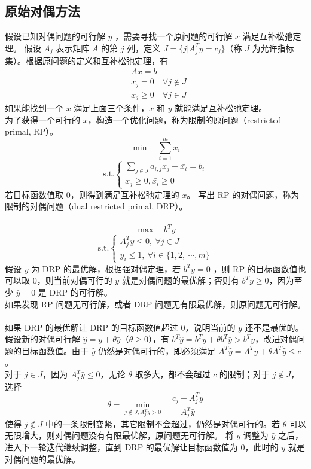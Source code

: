 \subsection{原始对偶方法}
假设已知对偶问题的可行解 $y$ ，需要寻找一个原问题的可行解 $x$ 满足互补松弛定理。
假设 $A_j$ 表示矩阵 $A$ 的第 $j$ 列，定义 $J = \{ j | A_j^Ty = c_j \}$（称 $J$ 为允许指标集）。根据原问题的定义和互补松弛定理，有
\begin{align}
& Ax = b \tag{1} \\ 
& x_j = 0 \quad \forall j \not\in J \tag{2} \\ 
& x_j \ge 0 \quad \forall j \in J \tag{3}
\end{align}
如果能找到一个 $x$ 满足上面三个条件，$x$ 和 $y$ 就能满足互补松弛定理。 \\
为了获得一个可行的 $x$，构造一个优化问题，称为限制的原问题（restricted primal, RP）。
$$
\min \quad \sum_{i = 1}^m \bar{x_i}
$$
$$
\text{s.t.} 
\begin{cases}
    \sum_{j \in J} a_{i, j}x_j + \bar{x_i} = b_i \\
    x_j \ge 0, \bar{x_i} \ge 0
\end{cases}
$$
若目标函数值取 $0$，则得到满足互补松弛定理的 $x$。
写出 RP 的对偶问题，称为限制的对偶问题（dual restricted primal, DRP）。 \\~\\ \pagebreak
$$
\max \quad b^Ty
$$
$$
\text{s.t.} 
\begin{cases}
    A^T_jy \le 0, \ \forall j \in J \\
    y_i \le 1, \ \forall i \in \{1, 2, \ \cdots, m\}
\end{cases}
$$
假设 $\bar{y}$ 为 DRP 的最优解，根据强对偶定理，若 $b^T\bar{y} = 0$ ，则 RP 的目标函数值也可以取 $0$，则当前对偶可行的 $y$ 就是对偶问题的最优解；否则有 $b^T\bar{y} \ge 0$，因为至少 $\bar{y} = 0$ 是 DRP 的可行解。 \\
如果发现 RP 问题无可行解，或者 DRP 问题无有限最优解，则原问题无可行解。 \\~\\
如果 DRP 的最优解让 DRP 的目标函数值超过 $0$，说明当前的 $y$ 还不是最优的。\\ 
假设新的对偶可行解 $\hat{y} = y + \theta\bar{y}$（$\theta \ge 0$），有 $b^T\hat{y} = b^Ty + \theta b^T\bar{y} > b^Ty$，改进对偶问题的目标函数值。由于 $\hat{y}$ 仍然是对偶可行的，即必须满足 $A^T\hat{y} = A^Ty + \theta A^T\hat{y} \le c$ 。 \\
对于 $j \in J$，因为 $A^T_j\bar{y} \le 0$，无论 $\theta$ 取多大，都不会超过 $c$ 的限制；对于 $j \not\in J$，选择
$$
\theta = \min_{j \not\in J, A^T_j\bar{y} > 0} \quad \frac{c_j - A^T_jy}{A^T_j\bar{y}}
$$
使得 $j \not\in J$ 中的一条限制变紧，其它限制不会超过，仍然是对偶可行的。若 $\theta$ 可以无限增大，则对偶问题没有有限最优解，原问题无可行解。
将 $y$ 调整为 $\hat{y}$ 之后，进入下一轮迭代继续调整，直到 DRP 的最优解让目标函数值为 $0$，此时的 $y$ 就是对偶问题的最优解。


